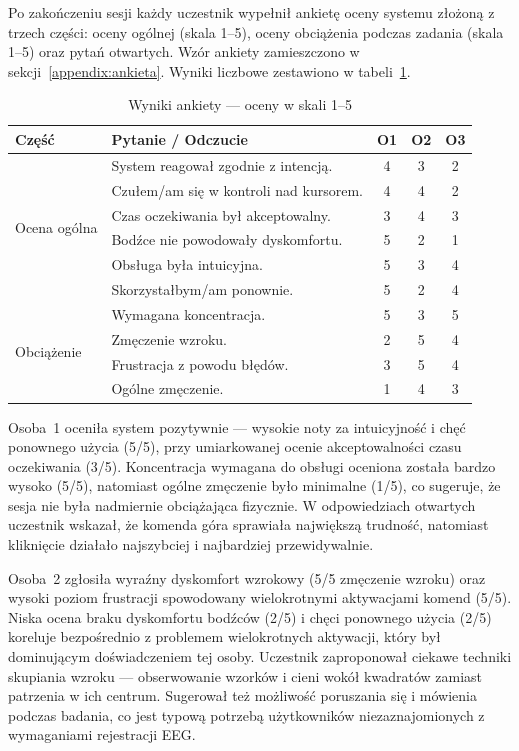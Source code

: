 Po zakończeniu sesji każdy uczestnik wypełnił ankietę oceny systemu
złożoną z trzech części: oceny ogólnej (skala 1--5), oceny obciążenia
podczas zadania (skala 1--5) oraz pytań otwartych. Wzór ankiety zamieszczono w sekcji~\ref{appendix:ankieta}. Wyniki liczbowe zestawiono w tabeli~\ref{tab:ankieta}.

\begin{table}[!ht]
\centering
\caption{Wyniki ankiety --- oceny w skali 1--5}
\label{tab:ankieta}
\begin{tabular}{lp{5.5cm}ccc}
    \toprule
    \textbf{Część} & \textbf{Pytanie / Odczucie}
        & \textbf{O1} & \textbf{O2} & \textbf{O3} \\
    \midrule
    \multirow{6}{*}{Ocena ogólna}
        & System reagował zgodnie z intencją.      & 4 & 3 & 2 \\
        & Czułem/am się w kontroli nad kursorem.   & 4 & 4 & 2 \\
        & Czas oczekiwania był akceptowalny.        & 3 & 4 & 3 \\
        & Bodźce nie powodowały dyskomfortu.        & 5 & 2 & 1 \\
        & Obsługa była intuicyjna.                  & 5 & 3 & 4 \\
        & Skorzystałbym/am ponownie.                & 5 & 2 & 4 \\
    \midrule
    \multirow{4}{*}{Obciążenie}
        & Wymagana koncentracja.                    & 5 & 3 & 5 \\
        & Zmęczenie wzroku.                         & 2 & 5 & 4 \\
        & Frustracja z powodu błędów.               & 3 & 5 & 4 \\
        & Ogólne zmęczenie.                         & 1 & 4 & 3 \\
    \bottomrule
\end{tabular}
\end{table}


Osoba~1 oceniła system pozytywnie --- wysokie noty za intuicyjność
i chęć ponownego użycia (5/5), przy umiarkowanej ocenie
akceptowalności czasu oczekiwania (3/5). Koncentracja wymagana
do obsługi oceniona została bardzo wysoko (5/5), natomiast
ogólne zmęczenie było minimalne (1/5), co sugeruje,
że sesja nie była nadmiernie obciążająca fizycznie.
W odpowiedziach otwartych uczestnik wskazał, że komenda góra
sprawiała największą trudność, natomiast kliknięcie działało
najszybciej i najbardziej przewidywalnie.

Osoba~2 zgłosiła wyraźny dyskomfort wzrokowy (5/5 zmęczenie wzroku)
oraz wysoki poziom frustracji spowodowany wielokrotnymi aktywacjami
komend (5/5). Niska ocena braku dyskomfortu bodźców (2/5)
i chęci ponownego użycia (2/5) koreluje bezpośrednio
z problemem wielokrotnych aktywacji, który był dominującym
doświadczeniem tej osoby. Uczestnik zaproponował ciekawe
techniki skupiania wzroku --- obserwowanie wzorków i cieni
wokół kwadratów zamiast patrzenia w ich centrum.
Sugerował też możliwość poruszania się i mówienia
podczas badania, co jest typową potrzebą użytkowników
niezaznajomionych z wymaganiami rejestracji EEG.


